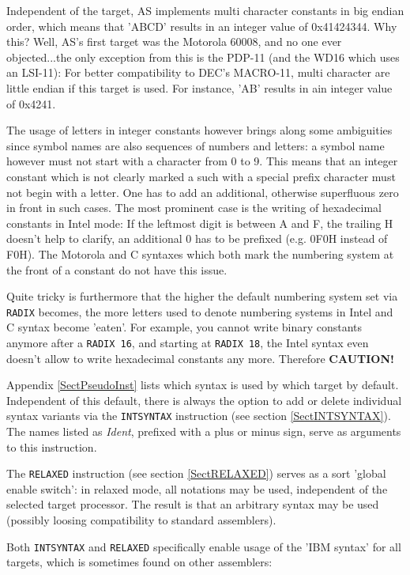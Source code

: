 \documentclass[12pt,twoside]{report}
\newcommand{\ii}[1]{{\it #1}}
\newcommand{\tty}[1]{{\tt #1}}
\newcommand{\asname}{{AS}}
\begin{document}
Independent of the target, \asname{} implements multi character constants
in big endian order, which means that 'ABCD' results in an integer
value of 0x41424344.  Why this? Well, \asname{}'s first target was the
Motorola 60008, and no one ever objected...the only exception from
this is the PDP-11 (and the WD16 which uses an LSI-11): For better
compatibility to DEC's MACRO-11, multi character are little endian
if this target is used.  For instance, 'AB' results in ain integer
value of 0x4241.

The usage of letters in integer constants however brings along some ambiguities
since symbol names are also sequences of numbers and letters: a symbol name
however must not start with a character from 0 to 9.  This means that an
integer constant which is not clearly marked a such with a special prefix
character must not begin with a letter.  One has to add an additional,
otherwise superfluous zero in front in such cases.  The most prominent case
is the writing of hexadecimal constants in Intel mode:  If the leftmost digit
is between A and F, the trailing H doesn't help to clarify, an additional 0
has to be prefixed (e.g. 0F0H instead of F0H).  The Motorola and C syntaxes
which both mark the numbering system at the front of a constant do not have
this issue.

Quite tricky is furthermore that the higher the default numbering system
set via {\tt RADIX} becomes, the more letters used to denote numbering
systems in Intel and C syntax become 'eaten'.  For example, you cannot
write binary constants anymore after a {\tt RADIX 16}, and starting at
{\tt RADIX 18}, the Intel syntax even doesn't allow to write hexadecimal
constants any more.  Therefore {\bf CAUTION!}

Appendix \ref{SectPseudoInst} lists which syntax is used by which target
by default.  Independent of this default, there is always the option to
add or delete individual syntax variants via the \tty{INTSYNTAX} instruction
(see section \ref{SectINTSYNTAX}).  The names listed as \ii{Ident},
prefixed with a plus or minus sign, serve as arguments to this instruction.

The \tty{RELAXED} instruction (see section \ref{SectRELAXED}) serves as
a sort 'global enable switch': in relaxed mode, all notations may be used,
independent of the selected target processor.  The result is that an arbitrary
syntax may be used (possibly loosing compatibility to standard assemblers).

Both \tty{INTSYNTAX} and \tty{RELAXED} specifically enable usage of the
'IBM syntax' for all targets, which is sometimes found on other assemblers:
\end{document}
